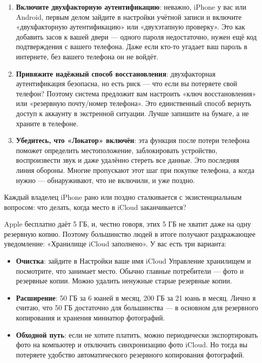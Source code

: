 \begin{enumerate}
  \item \textbf{Включите двухфакторную аутентификацию}: неважно, iPhone у вас или Android, первым делом зайдите в настройки учётной записи и включите «двухфакторную аутентификацию» или «двухэтапную проверку». Это как добавить засов к вашей двери — одного пароля недостаточно, нужен ещё код подтверждения с вашего телефона. Даже если кто-то угадает ваш пароль в интернете, без вашего телефона он не войдёт.
  \item \textbf{Привяжите надёжный способ восстановления}: двухфакторная аутентификация безопасна, но есть риск — что если вы потеряете свой телефон? Поэтому система предложит вам настроить «ключ восстановления» или «резервную почту/номер телефона». Это единственный способ вернуть доступ к аккаунту в экстренной ситуации. Лучше запишите на бумаге, а не храните в телефоне.
  \item \textbf{Убедитесь, что «Локатор» включён}: эта функция после потери телефона поможет определить местоположение, заблокировать устройство, воспроизвести звук и даже удалённо стереть все данные. Это последняя линия обороны. Многие пропускают этот шаг при покупке телефона, а когда нужно — обнаруживают, что не включили, и уже поздно.
\end{enumerate}


Каждый владелец iPhone рано или поздно сталкивается с экзистенциальным вопросом: что делать, когда место в iCloud заканчивается?

Apple бесплатно даёт 5 ГБ, и, честно говоря, этих 5 ГБ не хватит даже на одну резервную копию. Поэтому большинство людей в итоге получают раздражающее уведомление: «Хранилище iCloud заполнено». У вас есть три варианта:

\begin{itemize}
  \item \textbf{Очистка}: зайдите в Настройки ваше имя iCloud Управление хранилищем и посмотрите, что занимает место. Обычно главные потребители — фото и резервные копии. Можно удалить ненужные старые резервные копии.
  \item \textbf{Расширение}: 50 ГБ за 6 юаней в месяц, 200 ГБ за 21 юань в месяц. Лично я считаю, что 50 ГБ достаточно для большинства — в основном для резервного копирования и хранения миниатюр фотографий.
  \item \textbf{Обходной путь}: если не хотите платить, можно периодически экспортировать фото на компьютер и отключить синхронизацию фото iCloud. Но тогда вы потеряете удобство автоматического резервного копирования фотографий.
\end{itemize}


